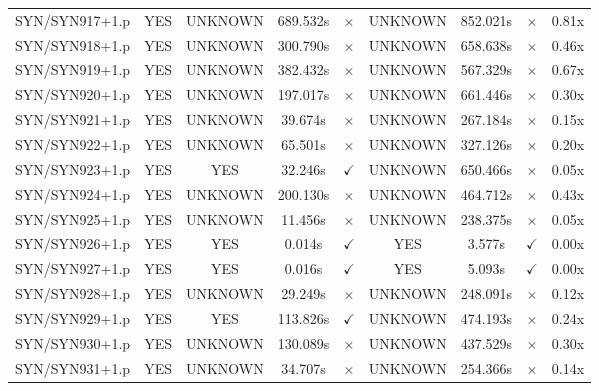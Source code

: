\documentclass[a4paper,10pt]{article}
\begin{document}
\begin{longtable}{lcccccccc}
SYN/SYN917+1.p & YES & UNKNOWN & 689.532s & \cellcolor{mismatchcolor}$\times$ & UNKNOWN & 852.021s & \cellcolor{mismatchcolor}$\times$ & 0.81x \\
SYN/SYN918+1.p & YES & UNKNOWN & 300.790s & \cellcolor{mismatchcolor}$\times$ & UNKNOWN & 658.638s & \cellcolor{mismatchcolor}$\times$ & 0.46x \\
SYN/SYN919+1.p & YES & UNKNOWN & 382.432s & \cellcolor{mismatchcolor}$\times$ & UNKNOWN & 567.329s & \cellcolor{mismatchcolor}$\times$ & 0.67x \\
SYN/SYN920+1.p & YES & UNKNOWN & 197.017s & \cellcolor{mismatchcolor}$\times$ & UNKNOWN & 661.446s & \cellcolor{mismatchcolor}$\times$ & 0.30x \\
SYN/SYN921+1.p & YES & UNKNOWN & 39.674s & \cellcolor{mismatchcolor}$\times$ & UNKNOWN & 267.184s & \cellcolor{mismatchcolor}$\times$ & 0.15x \\
SYN/SYN922+1.p & YES & UNKNOWN & 65.501s & \cellcolor{mismatchcolor}$\times$ & UNKNOWN & 327.126s & \cellcolor{mismatchcolor}$\times$ & 0.20x \\
SYN/SYN923+1.p & YES & YES & 32.246s & \cellcolor{matchcolor}$\checkmark$ & UNKNOWN & 650.466s & \cellcolor{mismatchcolor}$\times$ & 0.05x \\
SYN/SYN924+1.p & YES & UNKNOWN & 200.130s & \cellcolor{mismatchcolor}$\times$ & UNKNOWN & 464.712s & \cellcolor{mismatchcolor}$\times$ & 0.43x \\
SYN/SYN925+1.p & YES & UNKNOWN & 11.456s & \cellcolor{mismatchcolor}$\times$ & UNKNOWN & 238.375s & \cellcolor{mismatchcolor}$\times$ & 0.05x \\
SYN/SYN926+1.p & YES & YES & 0.014s & \cellcolor{matchcolor}$\checkmark$ & YES & 3.577s & \cellcolor{matchcolor}$\checkmark$ & 0.00x \\
SYN/SYN927+1.p & YES & YES & 0.016s & \cellcolor{matchcolor}$\checkmark$ & YES & 5.093s & \cellcolor{matchcolor}$\checkmark$ & 0.00x \\
SYN/SYN928+1.p & YES & UNKNOWN & 29.249s & \cellcolor{mismatchcolor}$\times$ & UNKNOWN & 248.091s & \cellcolor{mismatchcolor}$\times$ & 0.12x \\
SYN/SYN929+1.p & YES & YES & 113.826s & \cellcolor{matchcolor}$\checkmark$ & UNKNOWN & 474.193s & \cellcolor{mismatchcolor}$\times$ & 0.24x \\
SYN/SYN930+1.p & YES & UNKNOWN & 130.089s & \cellcolor{mismatchcolor}$\times$ & UNKNOWN & 437.529s & \cellcolor{mismatchcolor}$\times$ & 0.30x \\
SYN/SYN931+1.p & YES & UNKNOWN & 34.707s & \cellcolor{mismatchcolor}$\times$ & UNKNOWN & 254.366s & \cellcolor{mismatchcolor}$\times$ & 0.14x \\

\end{longtable}
\end{document}
